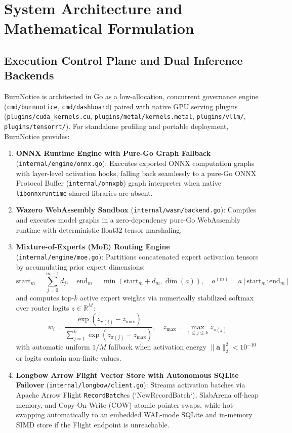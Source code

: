 \documentclass{article}
\begin{document}
\section{System Architecture and Mathematical Formulation}

\subsection{Execution Control Plane and Dual Inference Backends}
BurnNotice is architected in Go as a low-allocation, concurrent governance engine (\texttt{cmd/burnnotice}, \texttt{cmd/dashboard}) paired with native GPU serving plugins (\texttt{plugins/cuda\_kernels.cu}, \texttt{plugins/metal/kernels.metal}, \texttt{plugins/vllm/}, \texttt{plugins/tensorrt/}). For standalone profiling and portable deployment, BurnNotice provides:
\begin{enumerate}
    \item \textbf{ONNX Runtime Engine with Pure-Go Graph Fallback} (\texttt{internal/engine/onnx.go}): Executes exported ONNX computation graphs with layer-level activation hooks, falling back seamlessly to a pure-Go ONNX Protocol Buffer (\texttt{internal/onnxpb}) graph interpreter when native \texttt{libonnxruntime} shared libraries are absent.
    \item \textbf{Wazero WebAssembly Sandbox} (\texttt{internal/wasm/backend.go}): Compiles and executes model graphs in a zero-dependency pure-Go WebAssembly runtime with deterministic float32 tensor marshaling.
    \item \textbf{Mixture-of-Experts (MoE) Routing Engine} (\texttt{internal/engine/moe.go}): Partitions concatenated expert activation tensors by accumulating prior expert dimensions:
    \begin{equation}
        \text{start}_m = \sum_{j=0}^{m-1} d_j, \quad \text{end}_m = \min\!\left(\text{start}_m + d_m, \dim(a)\right), \quad a^{(m)} = a[\text{start}_m : \text{end}_m]
    \end{equation}
    and computes top-$k$ active expert weights via numerically stabilized softmax over router logits $z \in \mathbb{R}^M$:
    \begin{equation}
        w_i = \frac{\exp(z_{\pi(i)} - z_{\max})}{\sum_{j=1}^k \exp(z_{\pi(j)} - z_{\max})}, \quad z_{\max} = \max_{1 \le j \le k} z_{\pi(j)}
    \end{equation}
    with automatic uniform $1/M$ fallback when activation energy $\|\mathbf{a}\|_2^2 < 10^{-10}$ or logits contain non-finite values.
    \item \textbf{Longbow Arrow Flight Vector Store with Autonomous SQLite Failover} (\texttt{internal/longbow/client.go}): Streams activation batches via Apache Arrow Flight \texttt{RecordBatch}es (`NewRecordBatch`), SlabArena off-heap memory, and Copy-On-Write (COW) atomic pointer swaps, while hot-swapping automatically to an embedded WAL-mode SQLite and in-memory SIMD store if the Flight endpoint is unreachable.
\end{enumerate}
\end{document}
